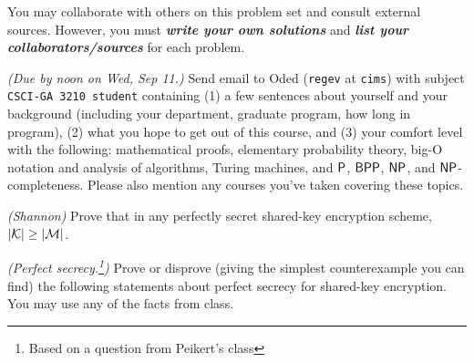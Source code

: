\medskip
\noindent You may collaborate with others on this problem set and
consult external sources.  However, you must \textbf{\emph{write your
    own solutions}} and \textbf{\emph{list your
    collaborators/sources}} for each problem.


\begin{questions}
  \question \emph{(Due by noon on Wed, Sep 11.)}  Send email to
  Oded (\texttt{regev} at \texttt{cims}) with subject \texttt{CSCI-GA 3210
    student} containing (1) a few sentences about yourself and your
  background (including your department, graduate program, how long in program), (2)
  what you hope to get out of this course, and (3) your comfort level
  with the following: mathematical proofs, elementary probability
  theory, big-O notation and analysis of algorithms, Turing machines,
  and $\P$, $\BPP$, $\NP$, and $\NP$-completeness.  Please also
  mention any courses you've taken covering these topics.

  \question[5] \emph{(Shannon)}  Prove that in any perfectly secret shared-key encryption scheme, $|\calK| \ge |\calM|$.

  \begin{solution}
				
  \end{solution}


  \question \emph{(Perfect secrecy.\footnote{Based on a question from Peikert's class\label{fn:peikert}})}  Prove or disprove (giving the
  simplest counterexample you can find) the following statements about
  perfect secrecy for shared-key encryption.  You may use any of the
  facts from class.

\end{questions}
